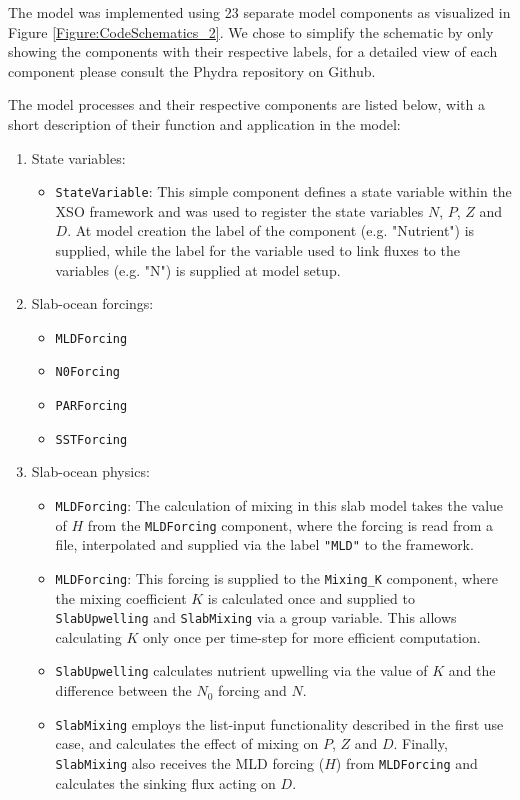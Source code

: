 \documentclass[journal abbreviation, manuscript]{copernicus}
\begin{document}
The model was implemented using 23 separate model components as visualized in Figure \ref{Figure:CodeSchematics_2}. We chose to simplify the schematic by only showing the components with their respective labels, for a detailed view of each component please consult the Phydra repository on Github.

The model processes and their respective components are listed below, with a short description of their function and application in the model:

\begin{enumerate}
    \item State variables:
    \begin{itemize}
        \item \texttt{StateVariable}: This simple component defines a state variable within the XSO framework and was used to register the state variables $N$, $P$, $Z$ and $D$. At model creation the label of the component (e.g. "Nutrient") is supplied, while the label for the variable used to link fluxes to the variables (e.g. "N") is supplied at model setup.
    \end{itemize}
    
    \item Slab-ocean forcings:
    \begin{itemize}
        \item \texttt{MLDForcing}
        \item \texttt{N0Forcing}
        \item \texttt{PARForcing}
        \item \texttt{SSTForcing}
    \end{itemize}
    
    \item Slab-ocean physics:
    \begin{itemize}
        \item \texttt{MLDForcing}: The calculation of mixing in this slab model takes the value of $H$ from the \texttt{MLDForcing} component, where the forcing is read from a file, interpolated and supplied via the label \texttt{"MLD"} to the framework. 
        \item \texttt{MLDForcing}: This forcing is supplied to the \texttt{Mixing\_K} component, where the mixing coefficient $K$ is calculated once and supplied to \texttt{SlabUpwelling} and \texttt{SlabMixing} via a group variable. This allows calculating $K$ only once per time-step for more efficient computation. 
        \item \texttt{SlabUpwelling} calculates nutrient upwelling via the value of $K$ and the difference between the $N_0$ forcing and $N$. 
        \item \texttt{SlabMixing} employs the list-input functionality described in the first use case, and calculates the effect of mixing on $P$, $Z$ and $D$. Finally, \texttt{SlabMixing} also receives the MLD forcing ($H$) from \texttt{MLDForcing} and calculates the sinking flux acting on $D$.
    \end{itemize}
    

\end{enumerate}
\end{document}
